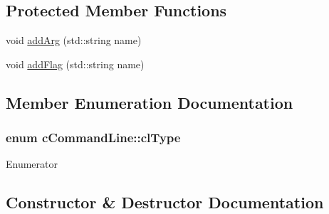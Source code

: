 \subsection*{Protected Member Functions}
\begin{DoxyCompactItemize}
\item 
void \hyperlink{classcCommandLine_a5eb5fa00de9315e96d44adaa5f2fb219}{add\+Arg} (std\+::string name)
\item 
void \hyperlink{classcCommandLine_a56d73201382df496e68984f2bdc4847b}{add\+Flag} (std\+::string name)
\end{DoxyCompactItemize}


\subsection{Member Enumeration Documentation}
\subsubsection[{\texorpdfstring{cl\+Type}{clType}}]{\setlength{\rightskip}{0pt plus 5cm}enum {\bf c\+Command\+Line\+::cl\+Type}}\hypertarget{classcCommandLine_a81ec4892969530bbd91486e6cb872054}{}\label{classcCommandLine_a81ec4892969530bbd91486e6cb872054}
\begin{Desc}
\item[Enumerator]\par
\begin{description}
\item[{\em 
clt\+Flag\hypertarget{classcCommandLine_a81ec4892969530bbd91486e6cb872054ae373dbf7e049b7d7fdbe75c4f91696cd}{}\label{classcCommandLine_a81ec4892969530bbd91486e6cb872054ae373dbf7e049b7d7fdbe75c4f91696cd}
}]\item[{\em 
clt\+Argument\hypertarget{classcCommandLine_a81ec4892969530bbd91486e6cb872054abf74da44500e2e049b5e00063306ee2e}{}\label{classcCommandLine_a81ec4892969530bbd91486e6cb872054abf74da44500e2e049b5e00063306ee2e}
}]\end{description}
\end{Desc}


\subsection{Constructor \& Destructor Documentation}
